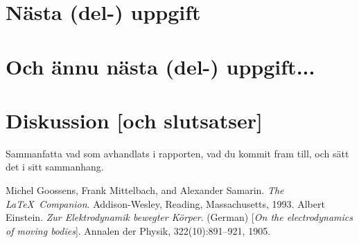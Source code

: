 \documentclass[a4paper,12pt]{article}
\begin{document}
\section{Nästa (del-) uppgift}
\label{sec:uppg2}

\section{Och ännu nästa (del-) uppgift...}
\label{sec:uppgN}

\section{Diskussion [och slutsatser]}
\label{sec:disk}

Sammanfatta vad som avhandlats i rapporten, vad du kommit fram till,
och sätt det i sitt sammanhang. 
%
\begin{thebibliography}{99}
%
Michel Goossens, Frank Mittelbach, and Alexander Samarin. 
\textit{The \LaTeX\ Companion}. 
Addison-Wesley, Reading, Massachusetts, 1993.
%
Albert Einstein. 
\textit{Zur Elektrodynamik bewegter K{\"o}rper}. (German) 
[\textit{On the electrodynamics of moving bodies}]. 
Annalen der Physik, 322(10):891–921, 1905.
%
\end{thebibliography}
%
\end{document}
